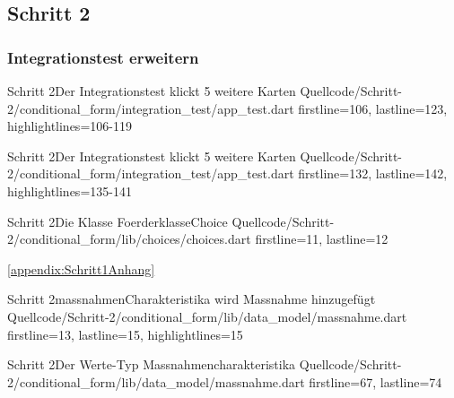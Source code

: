 \clearpage 

\subsection{Schritt 2}

\subsubsection{Integrationstest erweitern}


\begin{alexlisting}{Schritt 2}{Der Integrationstest klickt 5 weitere Karten}
  {Quellcode/Schritt-2/conditional_form/integration_test/app_test.dart}
  {firstline=106, lastline=123, highlightlines={106-119}}
  \label{lst:IntegrationstestKlickt5WeitereKarten}
\end{alexlisting}

\begin{alexlisting}{Schritt 2}{Der Integrationstest klickt 5 weitere Karten}
  {Quellcode/Schritt-2/conditional_form/integration_test/app_test.dart}
  {firstline=132, lastline=142, highlightlines={135-141}}
  \label{lst:IntegrationstestKlickt5WeitereKarten}
\end{alexlisting}

\begin{alexlisting}{Schritt 2}{Die Klasse FoerderklasseChoice}
  {Quellcode/Schritt-2/conditional_form/lib/choices/choices.dart}
  {firstline=11, lastline=12}
  \label{lst:Schritt2KlasseFoerderklasseChoice}
\end{alexlisting}

 \ref{appendix:Schritt1Anhang} 



\begin{alexlisting}{Schritt 2}{massnahmenCharakteristika wird Massnahme hinzugefügt}
  {Quellcode/Schritt-2/conditional_form/lib/data_model/massnahme.dart}
  {firstline=13, lastline=15, highlightlines={15}}
  \label{lst:Schritt2massnahmenCharakteristikaWirdMMassnahmeHinzugefuegt}
\end{alexlisting}


\begin{alexlisting}{Schritt 2}{Der Werte-Typ Massnahmencharakteristika}
  {Quellcode/Schritt-2/conditional_form/lib/data_model/massnahme.dart}
  {firstline=67, lastline=74}
  \label{lst:Schritt2WerteTypMassnahmencharakteristika}
\end{alexlisting}




